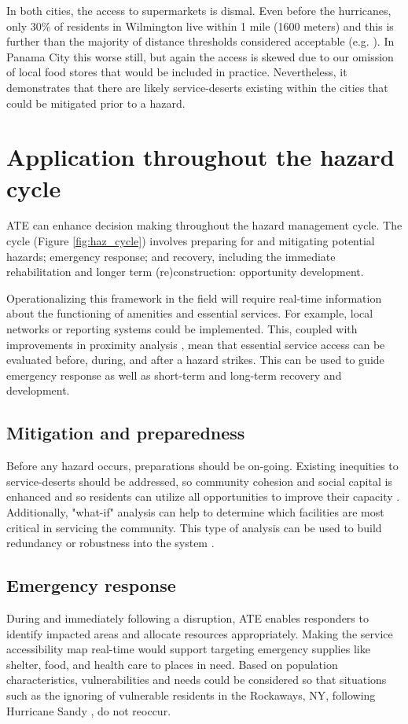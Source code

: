 \documentclass[9pt,twocolumn,twoside,lineno]{pnas-new}
\begin{document}
In both cities, the access to supermarkets is dismal.
Even before the hurricanes, only 30\% of residents in Wilmington live within 1 mile (1600 meters) and this is further than the majority of distance thresholds considered acceptable (e.g. \cite{Talen2003-dc}).
In Panama City this worse still, but again the access is skewed due to our omission of local food stores that would be included in practice.
Nevertheless, it demonstrates that there are likely service-deserts existing within the cities that could be mitigated prior to a hazard.

\section*{Application throughout the hazard cycle}
ATE can enhance decision making throughout the hazard management cycle. 
The cycle (Figure \ref{fig:haz_cycle}) involves preparing for and mitigating potential hazards; emergency response; and recovery, including the immediate rehabilitation and longer term (re)construction: opportunity development.

Operationalizing this framework in the field will require real-time information about the functioning of amenities and essential services.
For example, local networks or reporting systems could be implemented.
This, coupled with improvements in proximity analysis \cite{Logan2017-fr, noel2019-pypi}, mean that essential service access can be evaluated before, during, and after a hazard strikes.
This can be used to guide emergency response as well as short-term and long-term recovery and development. 

\subsection*{Mitigation and preparedness}
Before any hazard occurs, preparations should be on-going.
Existing inequities to service-deserts should be addressed, so community cohesion and social capital is enhanced \cite{Dempsey2011-og} and so residents can utilize all opportunities to improve their capacity \cite{Cutter2010-vg}.
Additionally, "what-if" analysis can help to determine which facilities are most critical in servicing the community. 
This type of analysis can be used to build redundancy or robustness into the system \cite{Wardekker2010-hw}.

\subsection*{Emergency response}
During and immediately following a disruption, ATE enables responders to identify impacted areas and allocate resources appropriately. 
Making the service accessibility map real-time would support targeting emergency supplies like shelter, food, and health care to places in need. 
Based on population characteristics, vulnerabilities and needs could be considered so that situations such as the ignoring of vulnerable residents in the Rockaways, NY, following Hurricane Sandy \cite{Subaiya2014-qx}, do not reoccur. 
\end{document}
